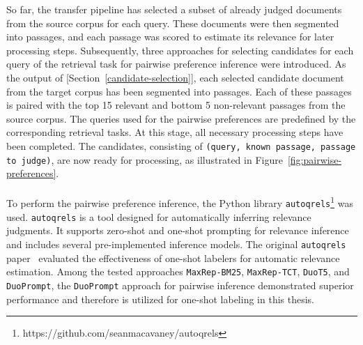 So far, the transfer pipeline has selected a subset of already judged documents from the source corpus for each query. These documents were then segmented into passages, and each passage was scored to estimate its relevance for later processing steps. Subsequently, three approaches for selecting candidates for each query of the retrieval task for pairwise preference inference were introduced. As the output of [Section~\ref{candidate-selection}], each selected candidate document from the target corpus has been segmented into passages. Each of these passages is paired with the top 15 relevant and bottom 5 non-relevant passages from the source corpus. The queries used for the pairwise preferences are predefined by the corresponding retrieval tasks. At this stage, all necessary processing steps have been completed. The candidates, consisting of \texttt{(query, known passage, passage to judge)}, are now ready for processing, as illustrated in Figure~\ref{fig:pairwise-preferences}.
\\\\
To perform the pairwise preference inference, the Python library \texttt{autoqrels}\footnote{https://github.com/seanmacavaney/autoqrels} was used. \texttt{autoqrels} is a tool designed for automatically inferring relevance judgments. It supports zero-shot and one-shot prompting for relevance inference and includes several pre-implemented inference models. The original \texttt{autoqrels} paper~\citep{macavaney:2023} evaluated the effectiveness of one-shot labelers for automatic relevance estimation. Among the tested approaches \texttt{MaxRep-BM25}, \texttt{MaxRep-TCT}, \texttt{DuoT5}, and \texttt{DuoPrompt}, the \texttt{DuoPrompt} approach for pairwise inference demonstrated superior performance and therefore is utilized for one-shot labeling in this thesis.

